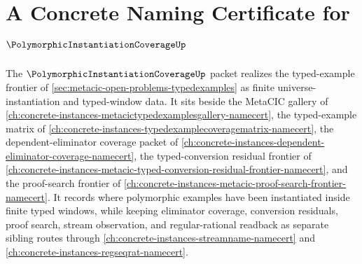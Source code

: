 \chapter{A Concrete Naming Certificate for $\PolymorphicInstantiationCoverageUp$}
\label{ch:concrete-instances-polymorphic-instantiation-coverage-namecert}

The $\PolymorphicInstantiationCoverageUp$ packet realizes the typed-example frontier of \autoref{sec:metacic-open-problems-typedexamples} as finite universe-instantiation and typed-window data. It sits beside the MetaCIC gallery of \autoref{ch:concrete-instances-metacictypedexamplesgallery-namecert}, the typed-example matrix of \autoref{ch:concrete-instances-typedexamplecoveragematrix-namecert}, the dependent-eliminator coverage packet of \autoref{ch:concrete-instances-dependent-eliminator-coverage-namecert}, the typed-conversion residual frontier of \autoref{ch:concrete-instances-metacic-typed-conversion-residual-frontier-namecert}, and the proof-search frontier of \autoref{ch:concrete-instances-metacic-proof-search-frontier-namecert}. It records where polymorphic examples have been instantiated inside finite typed windows, while keeping eliminator coverage, conversion residuals, proof search, stream observation, and regular-rational readback as separate sibling routes through \autoref{ch:concrete-instances-streamname-namecert} and \autoref{ch:concrete-instances-regseqrat-namecert}.

